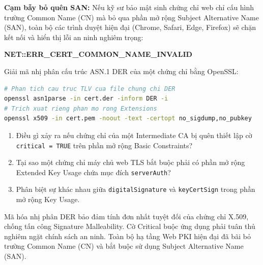 \begin{thuthach}
\textbf{Cạm bẫy bỏ quên SAN:} Nếu kỹ sư bảo mật sinh chứng chỉ web chỉ cấu hình trường Common Name (CN) mà bỏ qua phần mở rộng Subject Alternative Name (SAN), toàn bộ các trình duyệt hiện đại (Chrome, Safari, Edge, Firefox) sẽ chặn kết nối và hiển thị lỗi an ninh nghiêm trọng:
\begin{center}
\textbf{\color{warnred}NET::ERR\_CERT\_COMMON\_NAME\_INVALID}
\end{center}
\end{thuthach}

\begin{chayngay}
Giải mã nhị phân cấu trúc ASN.1 DER của một chứng chỉ bằng OpenSSL:
\begin{lstlisting}[language=bash]
# Phan tich cau truc TLV cua file chung chi DER
openssl asn1parse -in cert.der -inform DER -i
# Trich xuat rieng phan mo rong Extensions
openssl x509 -in cert.pem -noout -text -certopt no_sigdump,no_pubkey
\end{lstlisting}
\end{chayngay}

\begin{tukiemtra}
\begin{enumerate}
  \item Điều gì xảy ra nếu chứng chỉ của một Intermediate CA bị quên thiết lập cờ \texttt{critical = TRUE} trên phần mở rộng Basic Constraints?
  \item Tại sao một chứng chỉ máy chủ web TLS bắt buộc phải có phần mở rộng Extended Key Usage chứa mục đích \texttt{serverAuth}?
  \item Phân biệt sự khác nhau giữa \texttt{digitalSignature} và \texttt{keyCertSign} trong phần mở rộng Key Usage.
\end{enumerate}
\end{tukiemtra}

\begin{kbox}
Mã hóa nhị phân DER bảo đảm tính đơn nhất tuyệt đối của chứng chỉ X.509, chống tấn công Signature Malleability. Cờ Critical buộc ứng dụng phải tuân thủ nghiêm ngặt chính sách an ninh. Toàn bộ hạ tầng Web PKI hiện đại đã bãi bỏ trường Common Name (CN) và bắt buộc sử dụng Subject Alternative Name (SAN).
\end{kbox}
